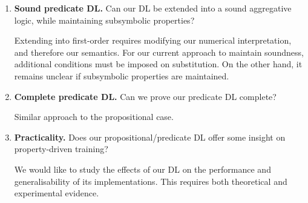 \begin{enumerate}
    \item \textbf{Sound predicate DL.} Can our DL be extended into a sound aggregative logic, while maintaining subsymbolic properties?

    Extending into first-order requires modifying our numerical interpretation, and therefore our semantics. For our current approach to maintain soundness, additional conditions must be imposed on substitution. On the other hand, it remains unclear if subsymbolic properties are maintained. 
    
    \item \textbf{Complete predicate DL.} Can we prove our predicate DL complete?
    
    Similar approach to the propositional case. 
    
    \item \textbf{Practicality.} Does our propositional/predicate DL offer some insight on property-driven training?

    We would like to study the effects of our DL on the performance and generalisability \citep{jakubovitz2019generalization} of its implementations. This requires both theoretical and experimental evidence. 
    
\end{enumerate}
